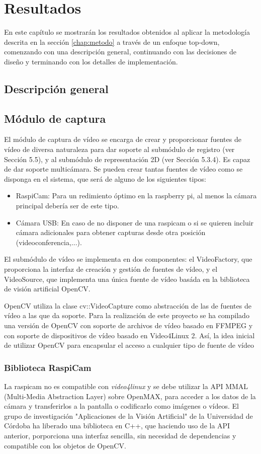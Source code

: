 \chapter{Resultados}
\label{chap:resultados}


En este capítulo se mostrarán los resultados obtenidos al aplicar la metodología descrita en la sección \ref{chap:metodo} a través de un enfoque top-down, comenzando con una descripción general, continuando con las decisiones
de diseño y terminando con los detalles de implementación. 

\section{Descripción general}
\section{Módulo de captura}
El módulo de captura de vídeo se encarga de crear y proporcionar fuentes de vídeo de diversa naturaleza para dar soporte al submódulo de registro (ver Sección 5.5), y al submódulo de representación 2D (ver Sección 5.3.4).
Es capaz de dar soporte multicámara. Se pueden crear tantas fuentes de vídeo como se disponga en el sistema, que será de alguno de los siguientes tipos: 
\begin{itemize}
\item RaspiCam: Para un redimiento óptimo en la raspberry pi, al menos la cámara principal debería ser de este tipo.
\item Cámara USB: En caso de no disponer de una raspicam o si se quieren incluir cámara adicionales para obtener capturas desde otra posición (videoconferencia,...).
\end{itemize}

El submódulo de vídeo se implementa en dos componentes: el VideoFactory, que proporciona la interfaz de creación y gestión de fuentes de vídeo, y el VideoSource, que implementa una única fuente de vídeo basáda en la biblioteca de visión artificial OpenCV.

OpenCV utiliza la clase cv::VideoCapture como abstracción de las de fuentes de vídeo a las que da soporte.
Para la realización de este proyecto se ha compilado una versión de OpenCV con soporte de archivos de vídeo basado en FFMPEG y con soporte de dispositivos de vídeo basado en Video4Linux 2. Así, la idea inicial de utilizar OpenCV para encapsular el acceso a cualquier tipo de fuente de vídeo 

\subsection{Biblioteca RaspiCam}
La raspicam no es compatible con \emph{video4linux} y se debe utilizar la API MMAL (Multi-Media Abstraction Layer) sobre OpenMAX, para acceder a los datos de la cámara y transferirlos a la pantalla o codificarlo como imágenes o vídeos.
El grupo de investigación "Aplicaciones de la Visión Artificial" de la Universidad de Córdoba ha liberado una biblioteca en C++, que haciendo uso de la API anterior, porporciona una interfaz sencilla, sin necesidad de dependencias y compatible con los objetos de OpenCV.

